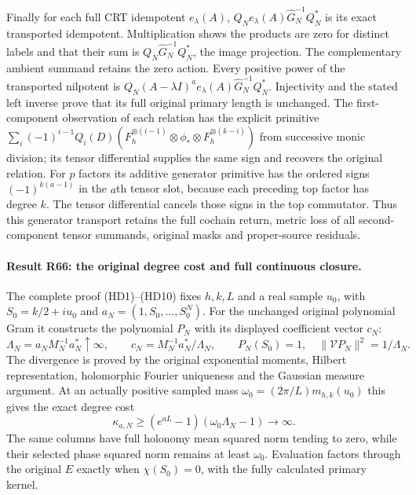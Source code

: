 Finally for each full CRT idempotent $e_\lambda(A)$,
$Q_N e_\lambda(A)\widehat G_N^{-1}Q_N^*$ is its exact
transported idempotent. Multiplication shows the products are
zero for distinct labels and that their sum is
$Q_N\widehat G_N^{-1}Q_N^*$, the image projection.
The complementary ambient summand retains the zero action.
Every positive power of the transported nilpotent is
$Q_N(A-\lambda I)^a e_\lambda(A)\widehat G_N^{-1}Q_N^*$.
Injectivity and the stated left inverse prove that its full
original primary length is unchanged. The first-component
observation of each relation has the explicit primitive
$\sum_i(-1)^{i-1}Q_i(D)
(F_h^{\otimes(i-1)}\otimes\phi_*\otimes F_h^{\otimes(k-i)})$
from successive monic division; its tensor differential
supplies the same sign and recovers the original relation.
For $p$ factors its additive generator primitive has the
ordered signs $(-1)^{k(a-1)}$ in the $a$th tensor slot,
because each preceding top factor has degree $k$.
The tensor differential cancels those signs in the top
commutator. Thus this generator transport retains the full
cochain return, metric loss of all second-component tensor
summands, original masks and proper-source residuals.


\paragraph{Result R66: the original degree cost and full continuous closure.}
The complete proof (HD1)--(HD10) fixes $h,k,L$ and a real sample
$u_0$, with $S_0=k/2+iu_0$ and $a_N=(1,S_0,\ldots,S_0^N)$.
For the unchanged original polynomial Gram it constructs the
polynomial $P_N$ with its displayed coefficient vector $c_N$:
\[
 \Lambda_N=a_NM_N^{-1}a_N^*\uparrow\infty,\qquad
 c_N=M_N^{-1}a_N^*/\Lambda_N,
 \qquad P_N(S_0)=1,\quad\|\mathcal V P_N\|^2=1/\Lambda_N.
\]
The divergence is proved by the original exponential moments,
Hilbert representation, holomorphic Fourier uniqueness and the
Gaussian measure argument. At an actually positive sampled mass
$\omega_0=(2\pi/L)m_{h,k}(u_0)$ this gives the exact degree cost
\[
 \kappa_{a,N}\ge(e^{aL}-1)(\omega_0\Lambda_N-1)
       \longrightarrow\infty .
\]
The same columns have full holonomy mean squared norm tending to zero,
while their selected phase squared norm remains at least $\omega_0$.
Evaluation factors through the original $E$ exactly when
$\chi(S_0)=0$, with the fully calculated primary kernel.

